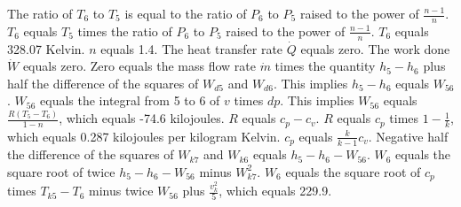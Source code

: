 The ratio of \( T_6 \) to \( T_5 \) is equal to the ratio of \( P_6 \) to \( P_5 \) raised to the power of \( \frac{n-1}{n} \).
\( T_6 \) equals \( T_5 \) times the ratio of \( P_6 \) to \( P_5 \) raised to the power of \( \frac{n-1}{n} \).
\( T_6 \) equals 328.07 Kelvin.
\( n \) equals 1.4.
The heat transfer rate \( \dot{Q} \) equals zero.
The work done \( \dot{W} \) equals zero.
Zero equals the mass flow rate \( \dot{m} \) times the quantity \( h_5 - h_6 \) plus half the difference of the squares of \( W_{d5} \) and \( W_{d6} \).
This implies \( h_5 - h_6 \) equals \( W_{56} \).
\( W_{56} \) equals the integral from 5 to 6 of \( v \) times \( dp \).
This implies \( W_{56} \) equals \( \frac{R(T_5 - T_6)}{1 - n} \), which equals -74.6 kilojoules.
\( R \) equals \( c_p - c_v \).
\( R \) equals \( c_p \) times \( 1 - \frac{1}{k} \), which equals 0.287 kilojoules per kilogram Kelvin.
\( c_p \) equals \( \frac{k}{k-1} c_v \).
Negative half the difference of the squares of \( W_{k7} \) and \( W_{k6} \) equals \( h_5 - h_6 - W_{56} \).
\( W_6 \) equals the square root of twice \( h_5 - h_6 - W_{56} \) minus \( W_{k7}^2 \).
\( W_6 \) equals the square root of \( c_p \) times \( T_{k5} - T_6 \) minus twice \( W_{56} \) plus \( \frac{v_k^2}{5} \), which equals 229.9.
